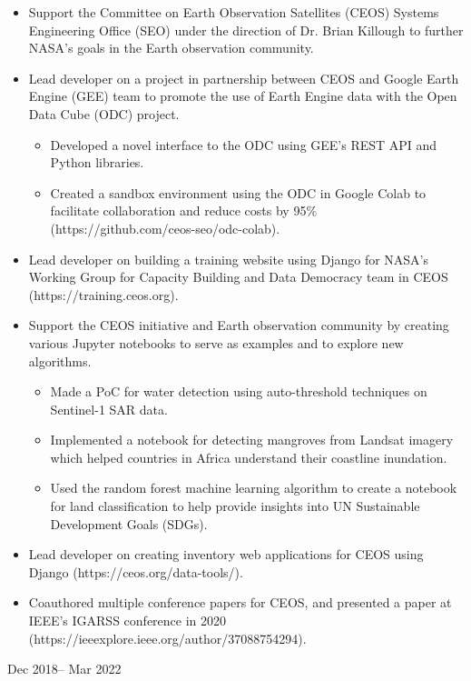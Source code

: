 \documentclass[11pt,a4paper]{moderncv}
\begin{document}
{
    \begin{itemize}
        \item{Support the Committee on Earth Observation Satellites (CEOS) Systems Engineering Office (SEO) under the direction of Dr. Brian Killough to further NASA's goals in the Earth observation community.}
        \item{Lead developer on a project in partnership between CEOS and Google Earth Engine (GEE) team to promote the use of Earth Engine data with the Open Data Cube (ODC) project.}
        \begin{itemize}
            \item{Developed a novel interface to the ODC using GEE's REST API and Python libraries.}
            \item{Created a sandbox environment using the ODC in Google Colab to facilitate collaboration and reduce costs by 95\% (https://github.com/ceos-seo/odc-colab).}
        \end{itemize}
        \item{Lead developer on building a training website using Django for NASA's Working Group for Capacity Building and Data Democracy team in CEOS (https://training.ceos.org).}
        \item{Support the CEOS initiative and Earth observation community by creating various Jupyter notebooks to serve as examples and to explore new algorithms.}
        \begin{itemize}
            \item{Made a PoC for water detection using auto-threshold techniques on Sentinel-1 SAR data.}
            \item{Implemented a notebook for detecting mangroves from Landsat imagery which helped countries in Africa understand their coastline inundation.}
            \item{Used the random forest machine learning algorithm to create a notebook for land classification to help provide insights into UN Sustainable Development Goals (SDGs).}
        \end{itemize}
        \item{Lead developer on creating inventory web applications for CEOS using Django (https://ceos.org/data-tools/).}
        \item{Coauthored multiple conference papers for CEOS, and presented a paper at IEEE's IGARSS conference in 2020 (https://ieeexplore.ieee.org/author/37088754294).}
    \end{itemize}
}
\cventry
{Dec 2018-- Mar 2022  }
\end{document}
